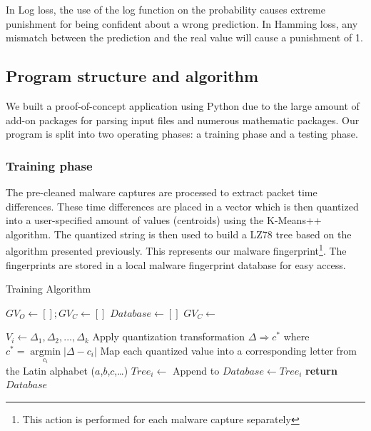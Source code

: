 \documentclass[9pt,journal,compsoc]{IEEEtran}
\begin{document}
In Log loss, the use of the log function on the probability causes extreme punishment for being confident about a wrong prediction.
In Hamming loss, any mismatch between the prediction and the real value will cause a punishment of 1.

\subsection{Program structure and algorithm}
We built a proof-of-concept application using Python due to the large amount of add-on packages for parsing input files and numerous mathematic packages.
Our program is split into two operating phases: a training phase and a testing phase.

\subsubsection{Training phase}\label{section:trainingp}
The pre-cleaned malware captures are processed to extract packet time differences.
These time differences are placed in a vector which is then quantized into a user-specified amount of values (centroids) using the K-Means++ algorithm. 
The quantized string is then used to build a LZ78 tree based on the algorithm presented previously. This represents our malware fingerprint\footnote{This action is performed for each malware capture separately}.
The fingerprints are stored in a local malware fingerprint database for easy access.
\begin{algorithm}
\caption{Training Algorithm}\label{alg:training}
\begin{algorithmic}[1]
\State ${GV}_O\gets[]; {GV}_C\gets[]$
\State ${Database}\gets[]$
   	\State {}
   \EndFor
   \State ${GV}_C\gets$

   	\State $V_i\gets\Delta_1,\Delta_2,...,\Delta_k$
   	\State Apply quantization transformation $
   	\Delta  \Rightarrow {c^*}$ where ${c^*} = \mathop {\arg \min }\limits_{{c_i}} \left| {\Delta  - {c_i}} \right|$
   	\State Map each quantized value  into a corresponding letter from the Latin alphabet ($a$,$b$,$c$,…)
   	\State ${Tree}_i\gets$
    \State Append to ${Database}\gets{Tree}_i$ \label{alg:training:append_db}
   \EndFor
   \State \textbf{return} $Database$
\EndProcedure
\end{algorithmic}
\end{algorithm}
\end{document}
